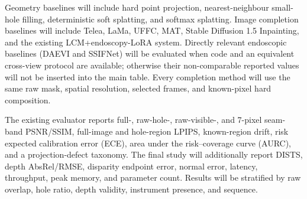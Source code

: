 \documentclass[letterpaper,10pt,conference]{ieeeconf}
\begin{document}
Geometry baselines will include hard point projection, nearest-neighbour
small-hole filling, deterministic soft splatting, and softmax splatting. Image
completion baselines will include Telea, LaMa, UFFC, MAT, Stable Diffusion 1.5
Inpainting, and the existing LCM+endoscopy-LoRA system. Directly relevant
endoscopic baselines (DAEVI and SSIFNet) will be evaluated when code and an
equivalent cross-view protocol are available; otherwise their non-comparable
reported values will not be inserted into the main table. Every completion
method will use the same raw mask, spatial resolution, selected frames, and
known-pixel hard composition.

The existing evaluator reports full-, raw-hole-, raw-visible-, and 7-pixel
seam-band PSNR/SSIM, full-image and hole-region LPIPS, known-region drift, risk
expected calibration error (ECE), area under the risk--coverage curve (AURC),
and a projection-defect taxonomy. The final study will additionally report DISTS, depth AbsRel/RMSE,
disparity endpoint error, normal error, latency, throughput, peak memory, and
parameter count. Results will be stratified by raw overlap, hole ratio, depth
validity, instrument presence, and sequence.
\end{document}
